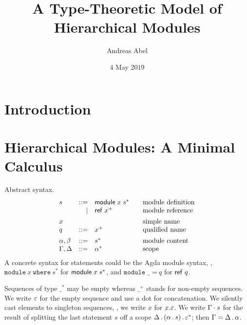 \documentclass{article}
\title{A Type-Theoretic Model of Hierarchical Modules}
\author{Andreas Abel}
\date{4 May 2019}
\theoremstyle{definition}
\theoremstyle{plain}
\theoremstyle{remark}
\begin{document}
\maketitle

\begin{abstract}
\end{abstract}

\section{Introduction}
\label{sec:intro}

\section{Hierarchical Modules: A Minimal Calculus}

Abstract syntax.
\[
\begin{array}{lrl@{\qquad}l}
  s & ::=  & \mdef x {s^*}    & \mbox{module definition} \\
    & \mid & \mref {x^+}      & \mbox{module reference}  \\[1ex]
  x &  &                      & \mbox{simple name}       \\
  q & ::=  & x^+              & \mbox{qualified name}    \\[1ex]
  \alpha,\beta  & ::= & s^*   & \mbox{module content}    \\
  \Gamma,\Delta & ::= & \Ga^* & \mbox{scope}             \\
\end{array}
\]
A concrete syntax for statements could be the Agda module syntax, \ie,
$\texttt{module}~x~\texttt{where}~s^*$ for $\mathsf{module}\;x\;s^*$, and
$\texttt{module~\_~=}~q$ for $\mathsf{ref}\;q$.

Sequences of type $\_^*$ may be empty whereas $\_^+$ stands for
non-empty sequences.
We write $\varepsilon$ for the empty sequence and use a dot %
for concatenation.
We silently cast elements to singleton sequences, \eg,
we write $x$ for $x.\varepsilon$.
We write $\Gamma \cdot s$ for the result of splitting the last
statement $s$ off a scope $\Delta \,.\, (\alpha \,.\, s) \,.\, \varepsilon^*$;
then $\Gamma = \Delta \,.\, \alpha$.
\end{document}
